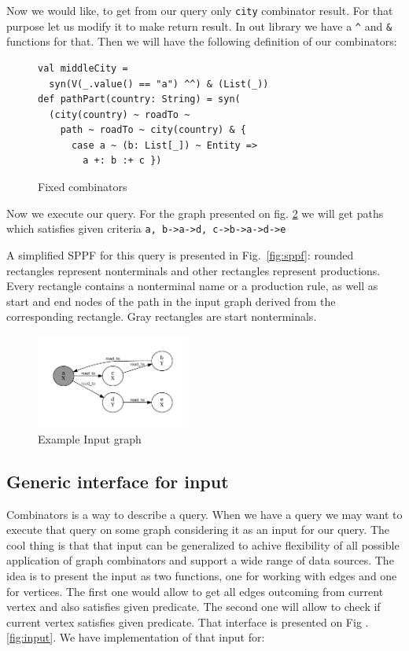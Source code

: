 Now we would like, to get from our query only \lstinline{city} combinator result. For that purpose let us modify it to make return result. In out library we have a \lstinline{^} and \lstinline{&} functions for that. Then we will have the following definition of our combinators:
\begin{figure}[h]
\begin{lstlisting}
val middleCity = 
  syn(V(_.value() == "a") ^^) & (List(_))
def pathPart(country: String) = syn(
  (city(country) ~ roadTo ~ 
    path ~ roadTo ~ city(country) & {
      case a ~ (b: List[_]) ~ Entity => 
        a +: b :+ c })
\end{lstlisting}
\caption{Fixed combinators}
\label{fig:fixedAtor}
\end{figure}

Now we execute our query. For the graph presented on fig. \ref{fig:graph} we will get paths which satisfies given criteria \lstinline{a, b->a->d, c->b->a->d->e}

A simplified SPPF for this query is presented in Fig.~\ref{fig:sppf}: rounded rectangles represent nonterminals and other rectangles represent productions. 
Every rectangle contains a nonterminal name or a production rule, as well as start and end nodes of the path in the input graph derived from the corresponding rectangle. 
Gray rectangles are start nonterminals.

\begin{figure}[h]
\includegraphics[width=0.45\textwidth]{graph}
\caption{Example Input graph}
\label{fig:graph}
\end{figure}


\subsection{Generic interface for input}
Combinators is a way to describe a query. When we have a query we may want to execute that query on some graph considering it as an input for our query. The cool thing is that that input can be generalized to achive flexibility of all possible application of graph combinators and support a wide range of data sources. The idea is to present the input as two functions, one for working with edges and one for vertices. The first one would allow to get all edges outcoming from current vertex and also satisfies given predicate. The second one will allow to check if current vertex satisfies given predicate. That interface is presented on Fig .\ref{fig:input}. We have implementation of that input for: 

